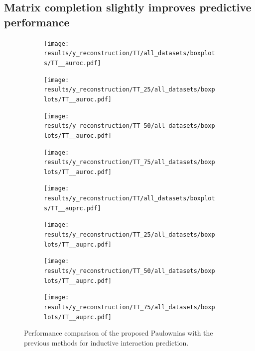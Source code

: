 \documentclass{article}
\begin{document}
\subsection{Matrix completion slightly improves predictive performance}

\begin{figure}
    \centering
    \begin{subfigure}{.24\textwidth}
        \texttt{[image: results/y\_reconstruction/TT/all\_datasets/boxplots/TT\_\_auroc.pdf]}
    \end{subfigure}
    \begin{subfigure}{.24\textwidth}
        \texttt{[image: results/y\_reconstruction/TT\_25/all\_datasets/boxplots/TT\_\_auroc.pdf]}
    \end{subfigure}
    \begin{subfigure}{.24\textwidth}
        \texttt{[image: results/y\_reconstruction/TT\_50/all\_datasets/boxplots/TT\_\_auroc.pdf]}
    \end{subfigure}
    \begin{subfigure}{.24\textwidth}
        \texttt{[image: results/y\_reconstruction/TT\_75/all\_datasets/boxplots/TT\_\_auroc.pdf]}
    \end{subfigure}

     \begin{subfigure}{.24\textwidth}
        \texttt{[image: results/y\_reconstruction/TT/all\_datasets/boxplots/TT\_\_auprc.pdf]}
    \end{subfigure}
    \begin{subfigure}{.24\textwidth}
        \texttt{[image: results/y\_reconstruction/TT\_25/all\_datasets/boxplots/TT\_\_auprc.pdf]}
    \end{subfigure}
    \begin{subfigure}{.24\textwidth}
        \texttt{[image: results/y\_reconstruction/TT\_50/all\_datasets/boxplots/TT\_\_auprc.pdf]}
    \end{subfigure}
    \begin{subfigure}{.24\textwidth}
        \texttt{[image: results/y\_reconstruction/TT\_75/all\_datasets/boxplots/TT\_\_auprc.pdf]}
    \end{subfigure}   
    \caption{Performance comparison of the proposed Paulownias with the previous methods for inductive interaction prediction.}
    \label{fig:ss_TT}
\end{figure}
\end{document}
